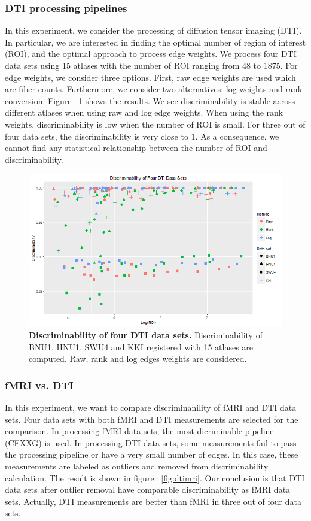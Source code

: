 \documentclass{article}
\begin{document}
\subsubsection{DTI processing pipelines}
In this experiment, we consider the processing of diffusion tensor imaging (DTI). In particular, we are interested in finding the optimal number of region of interest (ROI), and the optimal approach to process edge weights. We process four DTI data sets using 15 atlases with the number of ROI ranging from 48 to 1875. For edge weights, we consider three options. First, raw edge weights are used which are fiber counts. Furthermore, we consider two alternatives: log weights and rank conversion. Figure ~\ref{fig:dti} shows the results. We see discriminability is stable across different atlases when using raw and log edge weights. When using the rank weights, discriminability is low when the number of ROI is small. For three out of four data sets, the discriminability is very close to $1$. As a consequence, we cannot find any statistical relationship between the number of ROI and discriminability.


\begin{figure}[ht!]
	\includegraphics[width=\linewidth]{../Figs/four_dti.png}
	\caption{{ \bf Discriminability of four DTI data sets.} Discriminability of BNU1, HNU1, SWU4 and KKI registered with 15 atlases are computed. Raw, rank and log edges weights are considered. }
	\label{fig:dti}
\end{figure}

\subsubsection{fMRI vs. DTI}
In this experiment, we want to compare discriminanility of fMRI and DTI data sets. Four data sets with both fMRI and DTI measurements are selected for the comparison. In processing fMRI data sets, the most dicriminable pipeline (CFXXG) is used. In processing DTI data sets, some measurements fail to pass the processing pipeline or have a very small number of edges. In this case, these measurements are labeled as outliers and removed from discriminability calculation. The result is shown in figure ~\ref{fig:dtimri}. Our conclusion is that DTI data sets after outlier removal have comparable discriminability as fMRI data sets. Actually, DTI measurements are better than fMRI in three out of four data sets. 
\end{document}
